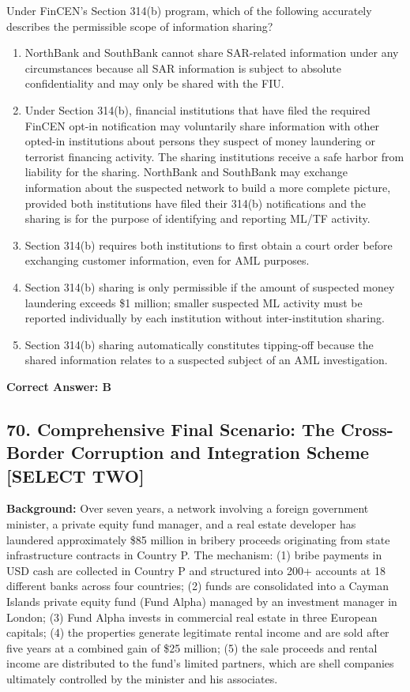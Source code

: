 \documentclass[11pt,a4paper]{article}
\begin{document}
	Under FinCEN's Section 314(b) program, which of the following accurately describes the permissible scope of information sharing?
	
	\begin{enumerate}[label=\Alph*.]
		\item NorthBank and SouthBank cannot share SAR-related information under any circumstances because all SAR information is subject to absolute confidentiality and may only be shared with the FIU.
		\item Under Section 314(b), financial institutions that have filed the required FinCEN opt-in notification may voluntarily share information with other opted-in institutions about persons they suspect of money laundering or terrorist financing activity. The sharing institutions receive a safe harbor from liability for the sharing. NorthBank and SouthBank may exchange information about the suspected network to build a more complete picture, provided both institutions have filed their 314(b) notifications and the sharing is for the purpose of identifying and reporting ML/TF activity.
		\item Section 314(b) requires both institutions to first obtain a court order before exchanging customer information, even for AML purposes.
		\item Section 314(b) sharing is only permissible if the amount of suspected money laundering exceeds \$1 million; smaller suspected ML activity must be reported individually by each institution without inter-institution sharing.
		\item Section 314(b) sharing automatically constitutes tipping-off because the shared information relates to a suspected subject of an AML investigation.
	\end{enumerate}
	\textbf{Correct Answer: B}
	
	\subsection{70. Comprehensive Final Scenario: The Cross-Border Corruption and Integration Scheme \textnormal{[SELECT TWO]}}
	
	\textbf{Background:} Over seven years, a network involving a foreign government minister, a private equity fund manager, and a real estate developer has laundered approximately \$85 million in bribery proceeds originating from state infrastructure contracts in Country P. The mechanism: (1) bribe payments in USD cash are collected in Country P and structured into 200+ accounts at 18 different banks across four countries; (2) funds are consolidated into a Cayman Islands private equity fund (Fund Alpha) managed by an investment manager in London; (3) Fund Alpha invests in commercial real estate in three European capitals; (4) the properties generate legitimate rental income and are sold after five years at a combined gain of \$25 million; (5) the sale proceeds and rental income are distributed to the fund's limited partners, which are shell companies ultimately controlled by the minister and his associates.
	
\end{document}
